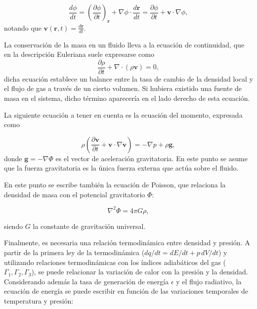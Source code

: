 \begin{equation}
  \frac{d \phi}{d t} = \left( \frac{\partial \phi}{\partial t} \right)_{\mathbf{r}} + \nabla \phi \cdot \frac{d \mathbf{r}}{d t} = \frac{\partial \phi}{\partial t} + \mathbf{v} \cdot \nabla \phi,
\end{equation}
notando que $\mathbf{v}(\mathbf{r}, t) = \frac{d \mathbf{r}}{d t}$.

La conservación de la masa en un fluido lleva a la ecuación de continuidad, que en la descripción Euleriana suele expresarse como
\begin{equation}
  \frac{\partial \rho}{\partial t} + \nabla \cdot (\rho \mathbf{v}) = 0,
  \label{eq:continuidad}
\end{equation}
dicha ecuación establece un balance entre la tasa de cambio de la densidad local y el flujo de gas a través de un cierto volumen. Si hubiera existido una fuente de masa en el sistema, dicho término aparecería en el lado derecho de esta ecuación.

La siguiente ecuación a tener en cuenta es la ecuación del momento, expresada como

\begin{equation}
  \rho \left( \frac{\partial \mathbf{v}}{\partial t} + \mathbf{v} \cdot \nabla \mathbf{v} \right) = -\nabla p + \rho \mathbf{g},
\end{equation}
donde $\mathbf{g} = - \nabla \Phi$ es el vector de aceleración gravitatoria. En este punto se asume que la fuerza gravitatoria es la única fuerza externa que actúa sobre el fluido.

En este punto se escribe también la ecuación de Poisson, que relaciona la densidad de masa con el potencial gravitatorio $\Phi$:

\begin{equation}
  \nabla^2 \Phi = 4 \pi G \rho,
\end{equation}

siendo $G$ la constante de gravitación universal.

Finalmente, es necesaria una relación termodinámica entre densidad y presión. A partir de la primera ley de la termodinámica ($d q/d t = d E/d t + p\, d V/d t$) y utilizando relaciones termodinámicas con los índices adiabáticos del gas ($\Gamma_1, \Gamma_2, \Gamma_3$), se puede relacionar la variación de calor con la presión y la densidad. Considerando además la tasa de generación de energía $\epsilon$ y el flujo radiativo, la ecuación de energía se puede escribir en función de las variaciones temporales de temperatura y presión:

